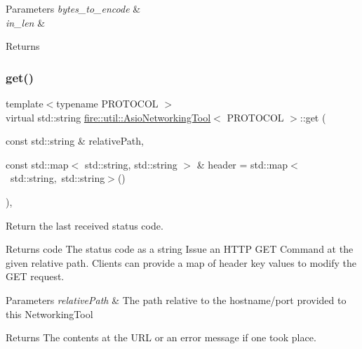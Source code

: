 \begin{DoxyParams}{Parameters}
{\em bytes\+\_\+to\+\_\+encode} & \\
\hline
{\em in\+\_\+len} & \\
\hline
\end{DoxyParams}
\begin{DoxyReturn}{Returns}

\end{DoxyReturn}
\mbox{\label{a01968_a40fed691e6b520a8e0f55734466896ca}} 
\subsubsection{\texorpdfstring{get()}{get()}}
{\footnotesize\ttfamily template$<$typename P\+R\+O\+T\+O\+C\+OL $>$ \\
virtual std\+::string \hyperlink{a01968}{fire\+::util\+::\+Asio\+Networking\+Tool}$<$ P\+R\+O\+T\+O\+C\+OL $>$\+::get (\begin{DoxyParamCaption}\item[{const std\+::string \&}]{relative\+Path,  }\item[{const std\+::map$<$ std\+::string, std\+::string $>$ \&}]{header = {\ttfamily std\+:\+:map$<$~std\+:\+:string,~std\+:\+:string$>$()} }\end{DoxyParamCaption})\hspace{0.3cm}{\ttfamily [inline]}, {\ttfamily [virtual]}}

Return the last received status code.

\begin{DoxyReturn}{Returns}
code The status code as a string Issue an H\+T\+TP G\+ET Command at the given relative path. Clients can provide a map of header key values to modify the G\+ET request.
\end{DoxyReturn}

\begin{DoxyParams}{Parameters}
{\em relative\+Path} & The path relative to the hostname/port provided to this Networking\+Tool \\
\hline
\end{DoxyParams}
\begin{DoxyReturn}{Returns}
The contents at the U\+RL or an error message if one took place. 
\end{DoxyReturn}


